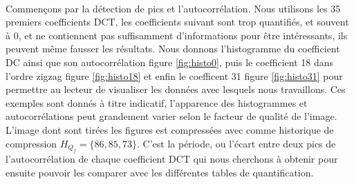 \documentclass[utf8,final]{stageM2R} %
\begin{document}
\paragraph{}
Commençons par la détection de pics et l'autocorrélation. Nous utilisons les 35 premiers coefficients DCT, les coefficients suivant sont trop quantifiés, et souvent à 0, et ne contiennent pas suffisamment d'informations pour être intéressants, ils peuvent même fausser les résultats. Nous donnons l'histogramme du coefficient DC ainsi que son autocorrélation figure \ref{fig:histo0}, puis le coefficient 18 dans l'ordre zigzag figure \ref{fig:histo18} et enfin le coefficent 31 figure \ref{fig:histo31} pour permettre au lecteur de visualiser les données avec lesquels nous travaillons. Ces exemples sont donnés à titre indicatif, l'apparence des histogrammes et autocorrélations peut grandement varier selon le facteur de qualité de l'image. L'image dont sont tirées les figures est compressées avec comme historique de compression $H_{Q_{f}} = \{86, 85, 73\}$. C'est la période, ou l'écart entre deux pics de l'autocorrélation de chaque coefficient DCT qui nous cherchons à obtenir pour ensuite pouvoir les comparer avec les différentes tables de quantification.
\end{document}
